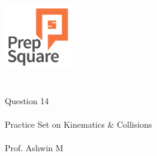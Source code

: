 \documentclass{beamer}
\begin{document}
\begin{center}
\ \\ \ \\
\includegraphics[width=30mm]{Logo-final.png} \\
\ \\ \ \\ 
{\huge Question 14 \\ \ \\ }
{\Large
Practice Set on Kinematics \& Collisions
}
{\large \ \\ \ \\ Prof. Ashwin M }
\end{center}
\end{document}
